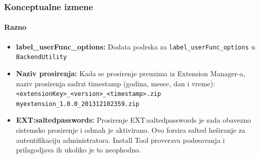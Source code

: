 \begin{frame}[fragile]
	\frametitle{Konceptualne izmene}
	\framesubtitle{Razno}

	\begin{itemize}

		\item \textbf{label\_userFunc\_options:}\newline
			\small
				Dodata podrska za \texttt{label\_userFunc\_options} u \texttt{BackendUtility}
			\normalsize

		\item \textbf{Naziv prosirenja:}\newline
			\small
				Kada se prosirenje preuzima iz Extension Manager-a, naziv prosirenja sadrzi timestamp (godina, mesec, dan i vreme):\newline
				\texttt{<extensionKey>\_<version>\_<timestamp>.zip}\newline
				\texttt{myextension\_1.0.0\_201312102359.zip}
			\normalsize

		\item \textbf{EXT:saltedpasswords:}\newline
			\small
				Prosirenje EXT:saltedpasswords je sada obavezno sistemsko prosirenje i odmah je aktivirano.
				Ovo forsira salted heširanje za autentifikaciju administratora. Install Tool proverava podesavanja i prilagodjava ih ukoliko je to neophodno.
			\normalsize

	\end{itemize}
	
\end{frame}



